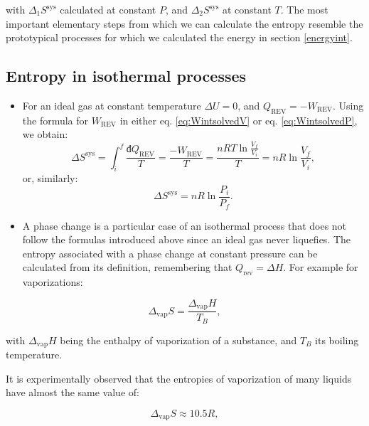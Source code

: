\documentclass[
]{book}
\theoremstyle{definition}
\theoremstyle{definition}
\theoremstyle{definition}
\theoremstyle{remark}
\begin{document}
with \(\Delta_1 S^{\text{sys}}\) calculated at constant \(P\), and \(\Delta_2 S^{\text{sys}}\) at constant \(T\). The most important elementary steps from which we can calculate the entropy resemble the prototypical processes for which we calculated the energy in section \ref{energyint}.

\hypertarget{entropy-in-isothermal-processes}{%
\subsection{Entropy in isothermal processes}\label{entropy-in-isothermal-processes}}

\begin{itemize}
\item
  For an ideal gas at constant temperature \(\Delta U =0\), and \(Q_{\mathrm{REV}} = -W_{\mathrm{REV}}\). Using the formula for \(W_{\mathrm{REV}}\) in either eq. \eqref{eq:WintsolvedV} or eq. \eqref{eq:WintsolvedP}, we obtain:
  \begin{equation}
  \Delta S^{\mathrm{sys}} = \int_i^f \frac{đQ_{\mathrm{REV}}}{T} = \frac{-W_{\mathrm{REV}}}{T} = \frac{nRT \ln \frac{V_f}{V_i}}{T} = nR \ln \frac{V_f}{V_i},
  \label{eq:sigconsttV}
  \end{equation}
  or, similarly:
  \begin{equation}
  \Delta S^{\mathrm{sys}} = nR \ln \frac{P_i}{P_f}.
  \label{eq:sigconsttP}
  \end{equation}
\item
  A phase change is a particular case of an isothermal process that does not follow the formulas introduced above since an ideal gas never liquefies. The entropy associated with a phase change at constant pressure can be calculated from its definition, remembering that \(Q_{\mathrm{rev}}= \Delta H\). For example for vaporizations:
\end{itemize}

\begin{equation}
\Delta_{\mathrm{vap}} S = \frac{\Delta_{\mathrm{vap}}H}{T_B},
\label{eq:spc}
\end{equation}

with \(\Delta_{\mathrm{vap}}H\) being the enthalpy of vaporization of a substance, and \(T_B\) its boiling temperature.

It is experimentally observed that the entropies of vaporization of many liquids have almost the same value of:

\begin{equation}
\Delta_{\mathrm{vap}} S \approx 10.5 R,
\label{eq:trouton}
\end{equation}
\end{document}
